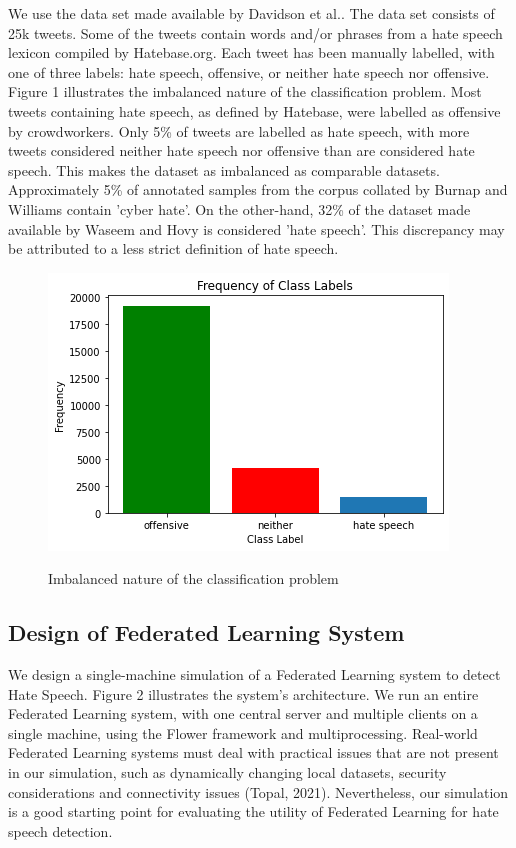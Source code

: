 \documentclass[letterpaper]{article} %
\begin{document}
We use the data set made available by Davidson et al.. The data set consists of 25k tweets. Some of the tweets contain words and/or phrases from a hate speech lexicon compiled by Hatebase.org. Each tweet has been manually labelled, with one of three labels: hate speech, offensive, or neither hate speech nor offensive. Figure 1 illustrates the imbalanced nature of the classification problem. Most tweets containing hate speech, as defined by Hatebase, were labelled as offensive by crowdworkers. Only 5\% of tweets are labelled as hate speech, with more tweets considered neither hate speech nor offensive than are considered hate speech. This makes the dataset as imbalanced as comparable datasets. Approximately 5\% of annotated samples from the corpus collated by Burnap and Williams contain 'cyber hate'. On the other-hand, 32\% of the dataset made available by Waseem and Hovy is considered 'hate speech'. This discrepancy may be attributed to a less strict definition of hate speech.

\begin{figure}[h]
{\includegraphics[width=\columnwidth]{Frequency_of_class_labels_in_population}}
\caption{Imbalanced nature of the classification problem}
\end{figure}

\subsection{Design of Federated Learning System}

We design a single-machine simulation of a Federated Learning system to detect Hate Speech. Figure 2 illustrates the system's architecture. We run an entire Federated Learning system, with one central server and multiple clients on a single machine, using the Flower framework and multiprocessing. Real-world Federated Learning systems must deal with practical issues that are not present in our simulation, such as dynamically changing local datasets, security considerations and connectivity issues (Topal, 2021). Nevertheless, our simulation is a good starting point for evaluating the utility of Federated Learning for hate speech detection.
\end{document}
